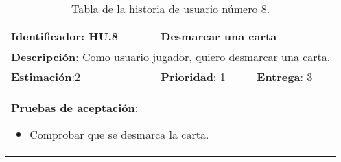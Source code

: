 \begin{table}[h]
  \begin{center}
    \begin{tabular}{|p{4cm}|p{4cm}|p{4cm}|}

    \hline
    \textbf{Identificador}: HU.8
    & \multicolumn{2}{p{8cm}|}{Desmarcar una carta}\\

    \hline
    \multicolumn{3}{|p{12cm}|}{\textbf{Descripción}: Como usuario jugador, quiero desmarcar una carta.}\\

    \hline
    \textbf{Estimación}:2
    & \textbf{Prioridad}: 1
    & \textbf{Entrega}: 3\\

    \hline
    \multicolumn{3}{|p{12cm}|}{\textbf{Pruebas de aceptación}:
      \begin{itemize}
        \item Comprobar que se desmarca la carta.
      \end{itemize}
    }\\

    \hline

    \end{tabular}

    \caption{Tabla de la historia de usuario número 8.}
    \label{tabla-hu8}

  \end{center}
\end{table}

